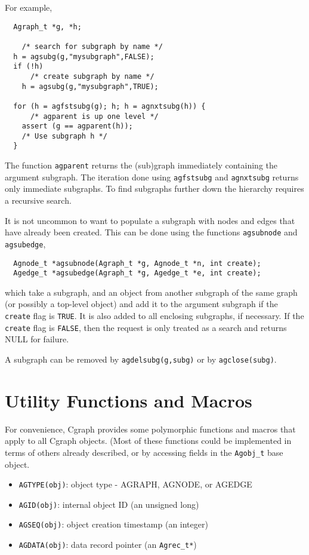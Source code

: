 \documentclass[11pt,letterpaper]{article}
\begin{document}
For example,
\begin{verbatim}
  Agraph_t *g, *h;

    /* search for subgraph by name */
  h = agsubg(g,"mysubgraph",FALSE);  
  if (!h) 
      /* create subgraph by name */
    h = agsubg(g,"mysubgraph",TRUE);   

  for (h = agfstsubg(g); h; h = agnxtsubg(h)) {
      /* agparent is up one level */
    assert (g == agparent(h));     
    /* Use subgraph h */
  }
\end{verbatim}

The function \verb"agparent" returns the (sub)graph immediately containing the
argument subgraph. The iteration done using \verb"agfstsubg" and \verb"agnxtsubg" 
returns only immediate subgraphs. To find subgraphs further down the hierarchy 
requires a recursive search.

It is not uncommon to want to populate a subgraph with nodes and edges that have
already been created. This can be done using
the functions \verb"agsubnode" and \verb"agsubedge", 
\begin{verbatim}
  Agnode_t *agsubnode(Agraph_t *g, Agnode_t *n, int create);
  Agedge_t *agsubedge(Agraph_t *g, Agedge_t *e, int create);
\end{verbatim}
which take a subgraph,
and an object from another subgraph of the same
graph (or possibly a top-level object) and add it to the argument subgraph
if the \verb"create" flag is \verb"TRUE".
It is also added to all enclosing subgraphs, if necessary.
If the \verb"create" flag is \verb"FALSE", then the
request is only treated as a search and returns NULL for failure.

A subgraph can be removed by \verb"agdelsubg(g,subg)" or by
\verb"agclose(subg)".

\section{Utility Functions and Macros}
\label{sec:utilityfunctionsandmacros}

For convenience, Cgraph provides some polymorphic functions and macros
that apply to all Cgraph objects.   (Most of these functions could
be implemented in terms of others already described, or by accessing
fields in the \verb"Agobj_t" base object.

\begin{itemize}
\item \verb"AGTYPE(obj)":  object type - AGRAPH, AGNODE, or AGEDGE
\item \verb"AGID(obj)": internal object ID (an unsigned long)
\item \verb"AGSEQ(obj)": object creation timestamp (an integer)
\item \verb"AGDATA(obj)": data record pointer (an \verb"Agrec_t*")
\end{itemize}
\end{document}
